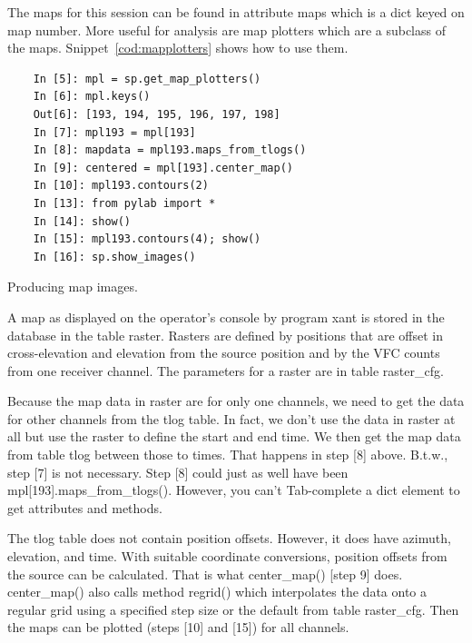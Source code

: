 \documentclass[letterpaper,11pt]{report}
\begin{document}
The maps for this session can be found in attribute {\ttfamily maps} which is a
{\ttfamily dict} keyed on map number.  More useful for analysis are map plotters
which are a subclass of the maps.  Snippet~\ref{cod:mapplotters} shows how to use
them.
\begin{code}[h!tb]
    \begin{center}
{\scriptsize \begin{verbatim}
    In [5]: mpl = sp.get_map_plotters()
    In [6]: mpl.keys()
    Out[6]: [193, 194, 195, 196, 197, 198]
    In [7]: mpl193 = mpl[193]
    In [8]: mapdata = mpl193.maps_from_tlogs()
    In [9]: centered = mpl[193].center_map()
    In [10]: mpl193.contours(2)
    In [13]: from pylab import *
    In [14]: show()
    In [15]: mpl193.contours(4); show()
    In [16]: sp.show_images()\end{verbatim}
        }\caption{\label{cod:mapplotters}Producing map images.}
    \end{center}
\end{code}
A map as displayed on the operator's console by program {\ttfamily xant} is
stored in the database in the table {\ttfamily raster}. Rasters are defined
by positions that are offset in cross-elevation and elevation from the 
source position and by the VFC counts from one receiver channel. The parameters
for a raster are in table {\ttfamily raster\_cfg}.

Because the map data in {\ttfamily raster} are for only one channels, we need
to get the data for other channels from the {\ttfamily tlog} table.
In fact, we don't use the data in {\ttfamily raster} at all but use the
raster to define the start and end time.  We then get the map data from table
{\ttfamily tlog} between those to times.  That happens in step [8] above.
B.t.w., step [7] is not necessary.  Step [8] could just as well have been
{\ttfamily mpl[193].maps\_from\_tlogs()}. However, you can't
{\ttfamily Tab}-complete a {\ttfamily dict} element to get attributes and
methods.

The {\ttfamily tlog} table does not contain position offsets.  However, it does
have azimuth, elevation, and time.  With suitable coordinate conversions,
position offsets from the source can be calculated.  That is what
{\ttfamily center\_map()} [step 9] does.  {\ttfamily center\_map()} also calls 
method {\ttfamily regrid()} which interpolates the data onto a regular grid 
using a specified step size or the default from table {\ttfamily raster\_cfg}.
Then the maps can be plotted (steps [10] and [15]) for all channels.
\end{document}
